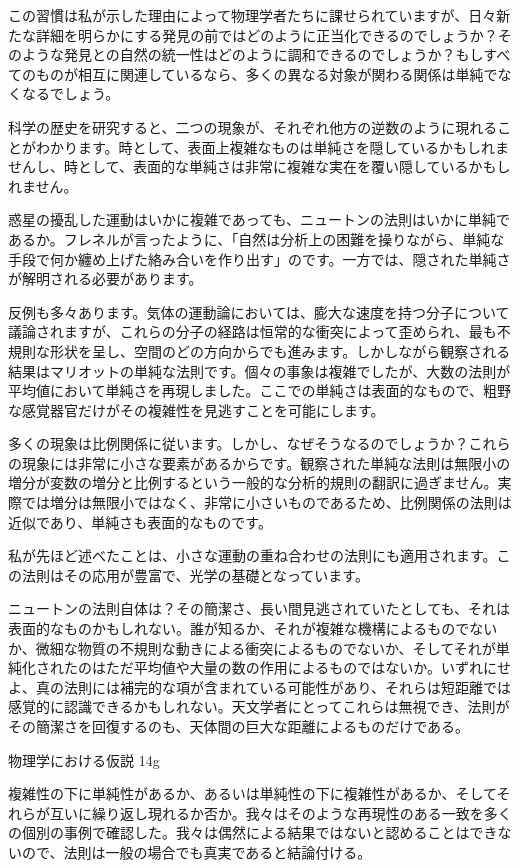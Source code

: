\documentclass[a4paper,11pt,openany]{ltjsbook}
\begin{document}
この習慣は私が示した理由によって物理学者たちに課せられていますが、日々新たな詳細を明らかにする発見の前ではどのように正当化できるのでしょうか？そのような発見との自然の統一性はどのように調和できるのでしょうか？もしすべてのものが相互に関連しているなら、多くの異なる対象が関わる関係は単純でなくなるでしょう。

科学の歴史を研究すると、二つの現象が、それぞれ他方の逆数のように現れることがわかります。時として、表面上複雑なものは単純さを隠しているかもしれませんし、時として、表面的な単純さは非常に複雑な実在を覆い隠しているかもしれません。

惑星の擾乱した運動はいかに複雑であっても、ニュートンの法則はいかに単純であるか。フレネルが言ったように、「自然は分析上の困難を操りながら、単純な手段で何か纏め上げた絡み合いを作り出す」のです。一方では、隠された単純さが解明される必要があります。

反例も多々あります。気体の運動論においては、膨大な速度を持つ分子について議論されますが、これらの分子の経路は恒常的な衝突によって歪められ、最も不規則な形状を呈し、空間のどの方向からでも進みます。しかしながら観察される結果はマリオットの単純な法則です。個々の事象は複雑でしたが、大数の法則が平均値において単純さを再現しました。ここでの単純さは表面的なもので、粗野な感覚器官だけがその複雑性を見逃すことを可能にします。

多くの現象は比例関係に従います。しかし、なぜそうなるのでしょうか？これらの現象には非常に小さな要素があるからです。観察された単純な法則は無限小の増分が変数の増分と比例するという一般的な分析的規則の翻訳に過ぎません。実際では増分は無限小ではなく、非常に小さいものであるため、比例関係の法則は近似であり、単純さも表面的なものです。

私が先ほど述べたことは、小さな運動の重ね合わせの法則にも適用されます。この法則はその応用が豊富で、光学の基礎となっています。

ニュートンの法則自体は？その簡潔さ、長い間見逃されていたとしても、それは表面的なものかもしれない。誰が知るか、それが複雑な機構によるものでないか、微細な物質の不規則な動きによる衝突によるものでないか、そしてそれが単純化されたのはただ平均値や大量の数の作用によるものではないか。いずれにせよ、真の法則には補完的な項が含まれている可能性があり、それらは短距離では感覚的に認識できるかもしれない。天文学者にとってこれらは無視でき、法則がその簡潔さを回復するのも、天体間の巨大な距離によるものだけである。

物理学における仮説 14g

複雑性の下に単純性があるか、あるいは単純性の下に複雑性があるか、そしてそれらが互いに繰り返し現れるか否か。我々はそのような再現性のある一致を多くの個別の事例で確認した。我々は偶然による結果ではないと認めることはできないので、法則は一般の場合でも真実であると結論付ける。
\end{document}
